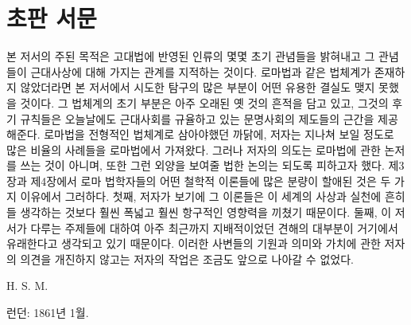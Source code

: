 \chapter*{초판 서문}

본 저서의 주된 목적은
고대법에 반영된 인류의 몇몇 초기 관념들을 밝혀내고
그 관념들이 근대사상에 대해 가지는 관계를 지적하는 것이다.
로마법과 같은 법체계가 존재하지 않았더라면
본 저서에서 시도한 탐구의 많은 부분이 어떤 유용한 결실도
맺지 못했을 것이다.
그 법체계의
초기 부분은 아주 오래된 옛 것의 흔적을 담고 있고,
그것의 후기 규칙들은 오늘날에도 근대사회를 규율하고 있는
문명사회의 제도들의 근간을 제공해준다.
로마법을 전형적인 법체계로 삼아야했던 까닭에,
저자는 지나쳐 보일 정도로 많은 비율의 사례들을
로마법에서 가져왔다.
그러나 저자의 의도는 로마법에 관한 논저를 쓰는 것이 아니며,
또한 그런 외양을 보여줄 법한 논의는 되도록 피하고자 했다.
제3장과 제4장에서
로마 법학자들의 어떤 철학적 이론들에 많은 분량이 할애된 것은
두 가지 이유에서 그러하다.
첫째, 저자가 보기에 그 이론들은
이 세계의 사상과 실천에
흔히들 생각하는 것보다
훨씬 폭넓고 훨씬 항구적인 영향력을 끼쳤기 때문이다.
둘째, 이 저서가 다루는 주제들에 대하여
아주 최근까지 지배적이었던 견해의 대부분이
거기에서 유래한다고 생각되고 있기 때문이다.
이러한 사변들의 기원과 의미와 가치에 관한
저자의 의견을 개진하지 않고는
저자의 작업은 조금도 앞으로 나아갈 수 없었다.

\begin{flushright}
H. S. M.
\end{flushright}

\begin{footnotesize}
런던: 1861년 1월.
\end{footnotesize}

